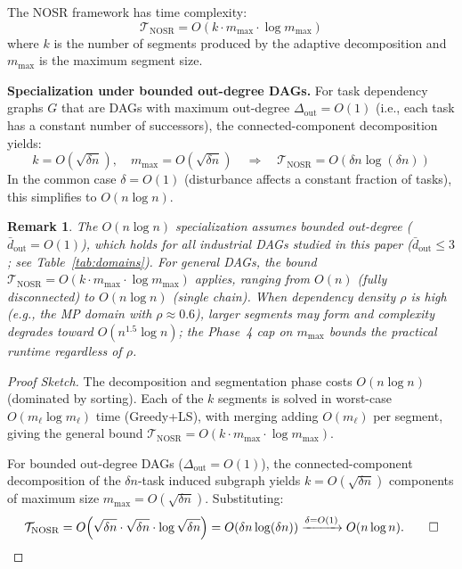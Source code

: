 \documentclass[manuscript,screen,review]{acmart}
\newtheorem{remark}{Remark}
\begin{document}
\begin{theorem}
\label{thm:time-complexity}
\label{thm:complexity}
The NOSR framework has time complexity:
\begin{equation}
  \mathcal{T}_{\mathrm{NOSR}} = O(k \cdot m_{\max} \cdot \log m_{\max})
  \label{eq:complexity-general}
\end{equation}
where $k$ is the number of segments produced by the adaptive decomposition
and $m_{\max}$ is the maximum segment size.

\noindent\textbf{Specialization under bounded out-degree DAGs.}
For task dependency graphs $G$ that are DAGs with maximum out-degree
$\Delta_{\mathrm{out}} = O(1)$ (i.e., each task has a constant number of successors), 
the connected-component decomposition yields:
\begin{equation}
  k = O\!\left(\sqrt{\delta n}\right), \quad
  m_{\max} = O\!\left(\sqrt{\delta n}\right)
  \quad\Rightarrow\quad
  \mathcal{T}_{\mathrm{NOSR}} = O(\delta n \log(\delta n))
  \label{eq:complexity-dag}
\end{equation}
In the common case $\delta = O(1)$ (disturbance affects a constant fraction
of tasks), this simplifies to $O(n \log n)$.
\end{theorem}

\begin{remark}
The $O(n \log n)$ specialization assumes bounded out-degree
($\bar{d}_{\mathrm{out}} = O(1)$), which holds for all industrial DAGs
studied in this paper ($\bar{d}_{\mathrm{out}} \leq 3$;
see Table~\ref{tab:domains}).
For general DAGs, the bound $\mathcal{T}_{\mathrm{NOSR}} =
O(k \cdot m_{\max} \cdot \log m_{\max})$ applies, ranging from
$O(n)$ (fully disconnected) to $O(n \log n)$ (single chain).
When dependency density $\rho$ is high (e.g., the MP domain with
$\rho \approx 0.6$), larger segments may form and complexity degrades
toward $O(n^{1.5} \log n)$; the Phase~4 cap on $m_{\max}$ bounds
the practical runtime regardless of $\rho$.
\end{remark}

\begin{proof}[Proof Sketch]
The decomposition and segmentation phase costs $O(n \log n)$ (dominated
by sorting). Each of the $k$ segments is solved in worst-case
$O(m_\ell \log m_\ell)$ time (Greedy+LS), with merging adding $O(m_\ell)$
per segment, giving the general bound
$\mathcal{T}_{\mathrm{NOSR}} = O(k \cdot m_{\max} \cdot \log m_{\max})$.

For bounded out-degree DAGs ($\Delta_{\mathrm{out}} = O(1)$), the
connected-component decomposition of the $\delta n$-task induced subgraph
yields $k = O(\sqrt{\delta n})$ components of maximum size
$m_{\max} = O(\sqrt{\delta n})$. Substituting:
\begin{equation}
  \mathcal{T}_{\mathrm{NOSR}}
  = O\!\left(\sqrt{\delta n} \cdot \sqrt{\delta n} \cdot \log\sqrt{\delta n}\right)
  = O(\delta n \log(\delta n))
  \xrightarrow{\delta = O(1)} O(n \log n). \qed
\end{equation}
\end{proof}
\end{document}
